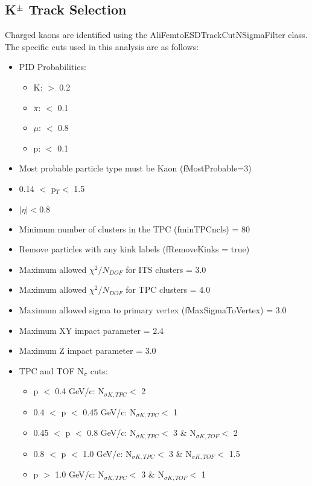 \documentclass[../AnalysisNoteJBuxton.tex]{subfiles}
\begin{document}
\subsection{\texorpdfstring{K$^{\pm}$}{TEXT} Track Selection}
\label{KchTrackSelection}

Charged kaons are identified using the AliFemtoESDTrackCutNSigmaFilter class.  The specific cuts used in this analysis are as follows:

\begin{itemize}
 \itemsep0em
 \item PID Probabilities:
 \begin{itemize}
  \itemsep0em
  \item K: $>$ 0.2  
  \item $\pi$: $<$ 0.1 
  \item $\mu$: $<$ 0.8
  \item p: $<$ 0.1
 \end{itemize}
 \item Most probable particle type must be Kaon (fMostProbable=3)
 \item 0.14 $<$ p$_{T} <$ 1.5
 \item $|\eta| < 0.8$
 \item Minimum number of clusters in the TPC (fminTPCncls) = 80
 \item Remove particles with any kink labels (fRemoveKinks = true)
 \item Maximum allowed $\chi^{2}/N_{DOF}$ for ITS clusters = 3.0
 \item Maximum allowed $\chi^{2}/N_{DOF}$ for TPC clusters = 4.0 
 \item Maximum allowed sigma to primary vertex (fMaxSigmaToVertex) = 3.0
 \item Maximum XY impact parameter = 2.4
 \item Maximum Z impact parameter = 3.0
 \item TPC and TOF N$_{\sigma}$ cuts:
  \begin{itemize}
  \itemsep0em
  \item p $<$ 0.4 GeV/c: N$_{\sigma K,TPC} <$ 2
  \item 0.4 $<$ p $<$ 0.45 GeV/c: N$_{\sigma K,TPC} <$ 1
  \item 0.45 $<$ p $<$ 0.8 GeV/c: N$_{\sigma K,TPC} <$ 3 \& N$_{\sigma K,TOF} <$ 2
  \item 0.8 $<$ p $<$ 1.0 GeV/c: N$_{\sigma K,TPC} <$ 3 \& N$_{\sigma K,TOF} <$ 1.5
  \item p $>$ 1.0 GeV/c: N$_{\sigma K,TPC} <$ 3 \& N$_{\sigma K,TOF} <$ 1    

\end{itemize}
\end{itemize}
\end{document}
